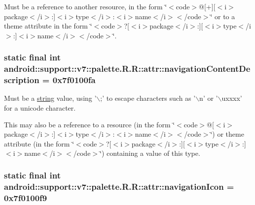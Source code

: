 Must be a reference to another resource, in the form \char`\"{}$<$code$>$@\mbox{[}+\mbox{]}\mbox{[}$<$i$>$package$<$/i$>$:\mbox{]}$<$i$>$type$<$/i$>$:$<$i$>$name$<$/i$>$$<$/code$>$\char`\"{} or to a theme attribute in the form \char`\"{}$<$code$>$?\mbox{[}$<$i$>$package$<$/i$>$:\mbox{]}\mbox{[}$<$i$>$type$<$/i$>$:\mbox{]}$<$i$>$name$<$/i$>$$<$/code$>$\char`\"{}. \hypertarget{classandroid_1_1support_1_1v7_1_1palette_1_1_r_1_1attr_e04bd5afc65c7d6e6ed09390d8282ffa}{
\subsubsection[{navigationContentDescription}]{\setlength{\rightskip}{0pt plus 5cm}static final int android::support::v7::palette.R.R::attr::navigationContentDescription = 0x7f0100fa}}
\label{classandroid_1_1support_1_1v7_1_1palette_1_1_r_1_1attr_e04bd5afc65c7d6e6ed09390d8282ffa}


Must be a \hyperlink{classandroid_1_1support_1_1v7_1_1palette_1_1_r_1_1string}{string} value, using '$\backslash$;' to escape characters such as '$\backslash$n' or '$\backslash$uxxxx' for a unicode character. 

This may also be a reference to a resource (in the form \char`\"{}$<$code$>$@\mbox{[}$<$i$>$package$<$/i$>$:\mbox{]}$<$i$>$type$<$/i$>$:$<$i$>$name$<$/i$>$$<$/code$>$\char`\"{}) or theme attribute (in the form \char`\"{}$<$code$>$?\mbox{[}$<$i$>$package$<$/i$>$:\mbox{]}\mbox{[}$<$i$>$type$<$/i$>$:\mbox{]}$<$i$>$name$<$/i$>$$<$/code$>$\char`\"{}) containing a value of this type. \hypertarget{classandroid_1_1support_1_1v7_1_1palette_1_1_r_1_1attr_69eb91991732d4e357c1e9bb08ca657f}{
\subsubsection[{navigationIcon}]{\setlength{\rightskip}{0pt plus 5cm}static final int android::support::v7::palette.R.R::attr::navigationIcon = 0x7f0100f9}}
\label{classandroid_1_1support_1_1v7_1_1palette_1_1_r_1_1attr_69eb91991732d4e357c1e9bb08ca657f}



